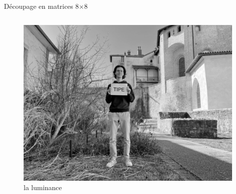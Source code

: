 \documentclass[xcolor=dvipsnames]{beamer}
\begin{document}
\begin{frame}{Découpage en matrices 8$\times$8}

    \begin{columns}

        \begin{column}{0.42\textwidth}
            \vspace{-80pt}
            \begin{figure}
                \centering
                \includegraphics[width=1\linewidth]{luminance.jpg}
                \caption{\centering la luminance}
            \end{figure}
        \end{column}
        

\end{columns}
\end{frame}
\end{document}

